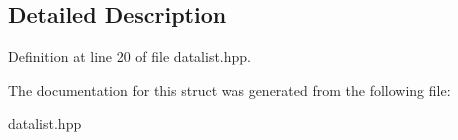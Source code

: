 \subsection{Detailed Description}


Definition at line 20 of file datalist.\-hpp.



The documentation for this struct was generated from the following file\-:\begin{DoxyCompactItemize}
\item 
datalist.\-hpp\end{DoxyCompactItemize}
